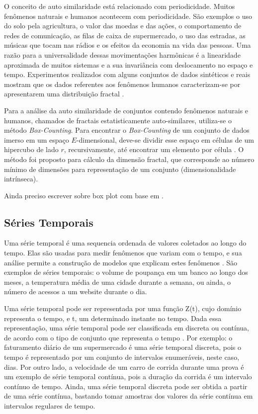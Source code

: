 O conceito de auto similaridade está relacionado com periodicidade. Muitos
fenômenos naturais e humanos acontecem com periodicidade. São exemplos o uso do
solo pela agricultura, o valor das moedas e das ações, o comportamento de redes
de comunicação, as filas de caixa de supermercado, o uso das estradas, as
músicas que tocam nas rádios e os efeitos da economia na vida das pessoas. Uma
razão para a universalidade dessas movimentações harmônicas é a linearidade
aproximada de muitos sistemas e a sua invariância com deslocamento no espaço e
tempo. Experimentos realizados com alguns conjuntos de dados sintéticos e reais
mostram que os dados referentes aos fenômenos humanos caracterizam-se por
apresentarem uma distribuição fractal \cite{Traina2010}.

Para a análise da auto similaridade de conjuntos contendo fenômenos naturais e
humanos, chamados de fractais estatisticamente auto-similares, utiliza-se o
método \textit{Box-Counting}. Para encontrar o \textit{Box-Counting} de um
conjunto de dados imerso em um espaço $E$-dimensional, deve-se dividir esse
espaço em células de um hipercubo de lado $r$, recursivamente, até encontrar um
elemento por célula \cite{Traina2010}. O método foi proposto para cálculo da
dimensão fractal, que corresponde ao número mínimo de dimensões para
representação de um conjunto (dimensionalidade intrínseca). 

Ainda preciso escrever sobre box plot com base em \cite{Traina2010}.

\subsection{Séries Temporais}
	\label{subsec:series_temporais}

Uma série temporal é uma sequencia ordenada de valores coletados ao longo do
tempo. Elas são usadas para medir fenômenos que variam com o tempo, e sua
análise permite a construção de modelos que explicam estes fenômenos
\cite{morettin2006analise}. São exemplos de séries temporais: o volume de
poupança em um banco ao longo dos meses, a temperatura média de uma cidade
durante a semana, ou ainda, o número de acessos a um website durante o dia.

Uma série temporal pode ser representada por uma função Z(t), cujo domínio
representa o tempo, e t, um determinado instante no tempo. Dada essa
representação, uma série temporal pode ser classificada em discreta ou contínua,
de acordo com o tipo de conjunto que representa o tempo
\cite{morettin2006analise}. Por exemplo: o faturamento diário de um supermercado
é uma série temporal discreta, pois o tempo é representado por um conjunto de
intervalos enumeráveis, neste caso, dias. Por outro lado, a velocidade de um
carro de corrida durante uma prova é um exemplo de série temporal contínua, pois
a duração da corrida é um intervalo contínuo de tempo. Ainda, uma série temporal
discreta pode ser obtida a partir de uma série contínua, bastando tomar amostras
dos valores da série contínua em intervalos regulares de tempo.

